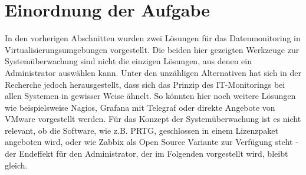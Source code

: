 \section{Einordnung der Aufgabe}
In den vorherigen Abschnitten wurden zwei Lösungen für das Datenmonitoring in Virtualisierungsumgebungen vorgestellt. Die beiden hier gezeigten Werkzeuge zur Systemüberwachung sind nicht die einzigen Lösungen, aus denen ein Administrator auswählen kann. Unter den unzähligen Alternativen hat sich in der Recherche jedoch herausgestellt, dass sich das Prinzip des IT-Monitorings bei allen Systemen in gewisser Weise ähnelt. So könnten hier noch weitere Lösungen wie beispielsweise Nagios, Grafana mit Telegraf oder direkte Angebote von VMware vorgestellt werden. Für das Konzept der Systemüberwachung ist es nicht relevant, ob die Software, wie z.B. PRTG, geschlossen in einem Lizenzpaket angeboten wird, oder wie Zabbix als Open Source Variante zur Verfügung steht - der Endeffekt für den Administrator, der im Folgenden vorgestellt wird, bleibt gleich.\medskip\\
\begin{comment}
Nagios\\
Grafana Visualisierung, Telegraf Datensammler\\
direkte Lösungen von VMware
Vergleich
Vorteil prtg: agentless monitoring --> geringe Last auf dem Zielgerät; durch Lizenzpaket auch Garantie bei Fehlern\\
nachteil: lizenzierung nach verwendeten Sensoren --> preis\\
vorteil zabbix: opensource\\
nachteil: skaliert schlecht bei sehr großen systemen\\
\end{comment}
